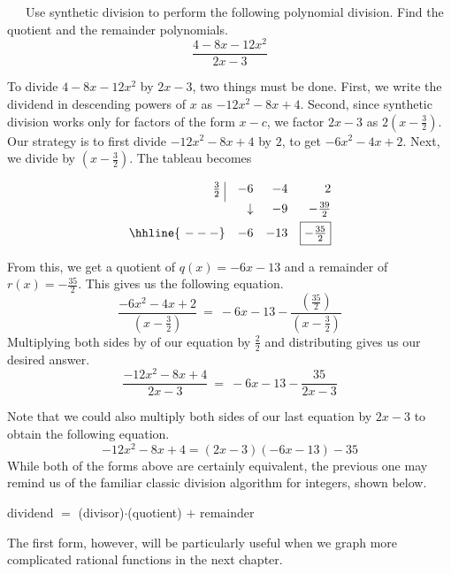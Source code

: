 \begin{example}~~~Use synthetic division to perform the following polynomial division.  Find the quotient and the remainder polynomials.
$$\dfrac{4-8x-12x^2}{2x-3}$$

To divide $4-8x-12x^2$ by $2x-3$, two things must be done.  First, we write the dividend in descending powers of $x$ as $-12x^2-8x+4$.  Second, since synthetic division works only for factors of the form $x-c$, we factor $2x-3$ as $2\left(x-\frac{3}{2}\right)$.  Our strategy is to first divide $-12x^2-8x+4$ by $2$, to get $-6x^2-4x+2$.  Next, we divide by $\left(x-\frac{3}{2}\right)$.  The tableau becomes

\[ \begin{array}{rrrr}


  \frac{3}{2} \, \, \vline& -6 & -4 & 2   \\ [4pt]

   & \downarrow &  -9  & -\frac{39}{2}  \\ [4pt] \hhline{~---} 
  &  -6  &   -13  & \fbox{$-\frac{35}{2}$}  \\  
\end{array}\]

From this, we get a quotient of $q(x)=-6 x - 13$ and a remainder of\\
$r(x)=-\frac{35}{2}$.  This gives us the following equation.
$$\frac{-6x^2-4x+2}{\left(x-\frac{3}{2}\right)}~=~-6 x - 13 - \frac{\left(\frac{35}{2}\right)}{\left(x-\frac{3}{2}\right)}$$
Multiplying both sides by of our equation by $\frac{2}{2}$ and distributing gives us our desired answer.
$$\frac{-12x^2-8x+4}{2x-3}~=~-6 x - 13 - \frac{35}{2x-3}$$
\end{example}
Note that we could also multiply both sides of our last equation by $2x-3$ to obtain the following equation.
$$-12x^2-8x+4 = \left(2x-3\right) (-6 x - 13) - 35$$
While both of the forms above are certainly equivalent, the previous one may remind us of the familiar classic division algorithm for integers, shown below.
\begin{center}
dividend $=$ (divisor)$\cdot$(quotient) $+$ remainder
\end{center}
The first form, however, will be particularly useful when we graph more complicated rational functions in the next chapter.